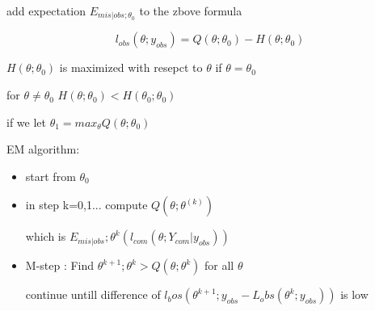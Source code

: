 \documentclass[10pt]{article}
\theoremstyle{break}
\begin{document}
        add expectation $E_{mis|obs;\theta_0}$ to the zbove formula

        $$l_{obs}(\theta;y_{obs }) = Q(\theta;\theta_0)-H(\theta;\theta_0)$$

        \begin{lemma}
            $H(\theta;\theta_0)$ is maximized with resepct to $\theta$ if $\theta= \theta_0$

            for $\theta\neq\theta_0$ $H(\theta;\theta_0) < H(\theta_0;\theta_0)$

            if we let $\theta_1= max_{\theta}Q(\theta;\theta_0)$

        \end{lemma}

        EM algorithm:

        \begin{itemize}
            \item start from $\theta_0$
            \item in step k=0,1... compute $Q(\theta;\theta^{(k)})$
            
            which is $E_{mis|obs};\theta^{k} (l_{com}(\theta;Y_{com}|y_{obs}))$

            \item M-step : Find $\theta^{k+1};\theta^k > Q(\theta;\theta^k)$ for all $\theta$


            continue untill difference of $l_bos(\theta^{k+1};y_{obs}-L_obs(\theta^k;y_{obs}))$ is low
        \end{itemize}
\end{document}
